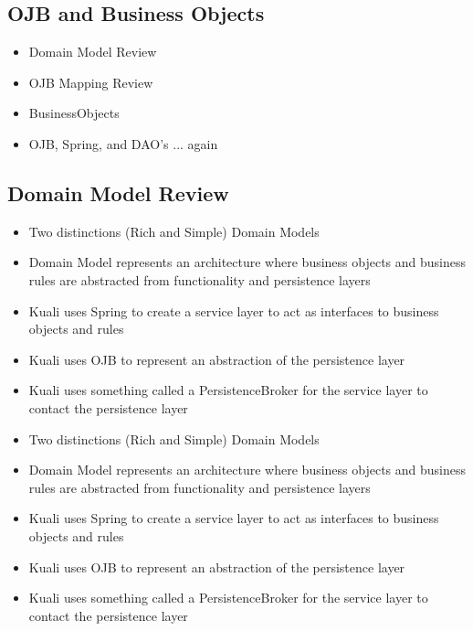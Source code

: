\begin{ifhtml}
    \begin{s5slide}
        \section{OJB and Business Objects}
        \begin{itemize}
          \item Domain Model Review
          \item OJB Mapping Review
          \item BusinessObjects
          \item OJB, Spring, and DAO's ... again
        \end{itemize}
        \begin{s5notes}
        \end{s5notes}
    \end{s5slide}
    
    \begin{s5slide}
      \section{Domain Model Review}
      \begin{itemize}
        \item Two distinctions (Rich and Simple) Domain Models
        \item Domain Model represents an architecture where business objects and business rules are 
          abstracted from functionality and persistence layers
        \item Kuali uses Spring to create a service layer to act as interfaces to business objects and
          rules
        \item Kuali uses OJB to represent an abstraction of the persistence layer
        \item Kuali uses something called a PersistenceBroker for the service layer to
          contact the persistence layer
      \end{itemize}
      \begin{s5notes}
        \begin{itemize}
        \item Two distinctions (Rich and Simple) Domain Models
        \item Domain Model represents an architecture where business objects and business rules are 
          abstracted from functionality and persistence layers
        \item Kuali uses Spring to create a service layer to act as interfaces to business objects and
          rules
        \item Kuali uses OJB to represent an abstraction of the persistence layer
        \item Kuali uses something called a PersistenceBroker for the service layer to
          contact the persistence layer
        \end{itemize}
      \end{s5notes}
    \end{s5slide}


\end{ifhtml}
